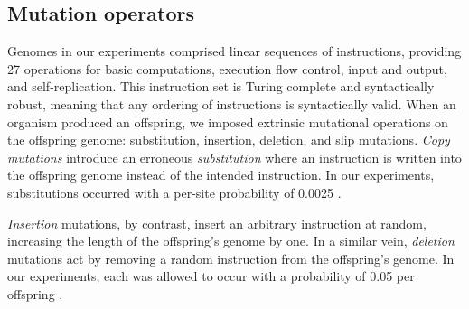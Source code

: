 \subsection{Mutation operators}

Genomes in our experiments comprised linear sequences of instructions, providing 27 operations for basic computations, execution flow control, input and output, and self-replication.
This instruction set is Turing complete and syntactically robust, meaning that any ordering of instructions is syntactically valid.
When an organism produced an offspring, we imposed extrinsic mutational operations on the offspring genome: substitution, insertion, deletion, and slip mutations.
\textit{Copy mutations} introduce an erroneous \textit{substitution} where an instruction is written into the offspring genome instead of the intended instruction.
In our experiments, substitutions occurred with a per-site probability of 0.0025 \citep{Lenski2003Evolutionary}.

\textit{Insertion} mutations, by contrast, insert an arbitrary instruction at random, increasing the length of the offspring's genome by one.
In a similar vein, \textit{deletion} mutations act by removing a random instruction from the offspring's genome.
In our experiments, each was allowed to occur with a probability of 0.05 per offspring \citep{Lenski2003Evolutionary}.


